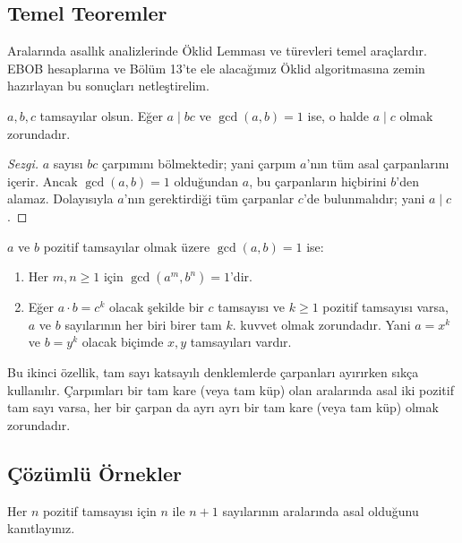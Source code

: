 \subsection{Temel Teoremler}

Aralarında asallık analizlerinde Öklid Lemması ve türevleri temel araçlardır. EBOB hesaplarına ve Bölüm 13'te ele alacağımız Öklid algoritmasına zemin hazırlayan bu sonuçları netleştirelim.

\begin{theorem}
$a, b, c$ tamsayılar olsun. Eğer $a \mid bc$ ve $\gcd(a, b) = 1$ ise, o halde $a \mid c$ olmak zorundadır.
\end{theorem}
\begin{proof}[Sezgi]
$a$ sayısı $bc$ çarpımını bölmektedir; yani çarpım $a$'nın tüm asal çarpanlarını içerir. Ancak $\gcd(a, b) = 1$ olduğundan $a$, bu çarpanların hiçbirini $b$'den alamaz. Dolayısıyla $a$'nın gerektirdiği tüm çarpanlar $c$'de bulunmalıdır; yani $a \mid c$.
\end{proof}

\begin{theorem}
$a$ ve $b$ pozitif tamsayılar olmak üzere $\gcd(a, b) = 1$ ise:
\begin{enumerate}
    \item Her $m, n \ge 1$ için $\gcd(a^m, b^n) = 1$'dir.
    \item Eğer $a \cdot b = c^k$ olacak şekilde bir $c$ tamsayısı ve $k \ge 1$ pozitif tamsayısı varsa, $a$ ve $b$ sayılarının her biri birer tam $k$. kuvvet olmak zorundadır. Yani $a = x^k$ ve $b = y^k$ olacak biçimde $x, y$ tamsayıları vardır.
\end{enumerate}
\end{theorem}

Bu ikinci özellik, tam sayı katsayılı denklemlerde çarpanları ayırırken sıkça kullanılır. Çarpımları bir tam kare (veya tam küp) olan aralarında asal iki pozitif tam sayı varsa, her bir çarpan da ayrı ayrı bir tam kare (veya tam küp) olmak zorundadır.

\subsection{Çözümlü Örnekler}

\begin{example}
Her $n$ pozitif tamsayısı için $n$ ile $n+1$ sayılarının aralarında asal olduğunu kanıtlayınız.
\end{example}

